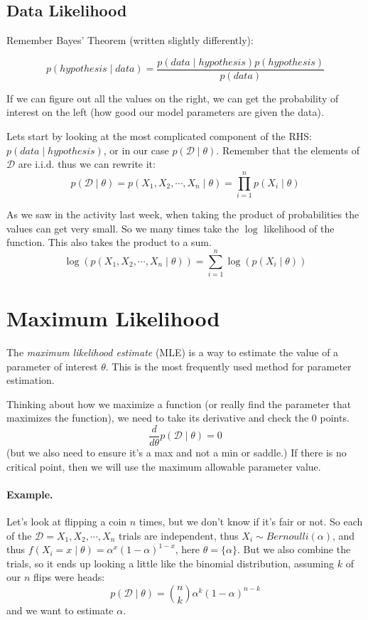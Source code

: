 \subsection{Data Likelihood}
Remember Bayes' Theorem (written slightly differently): 

\[p(hypothesis \mid data) = \frac{p(data \mid hypothesis) p(hypothesis)}{p(data)}\]

If we can figure out all the values on the right, we can get the probability of interest on the left 
(how good our model parameters are given the data).  

Lets start by looking at the most complicated component of the RHS: $p(data \mid hypothesis)$, 
or in our case $p(\mathcal{D} \mid \theta)$. 
Remember that the elements of $\mathcal{D}$ are i.i.d. thus we can rewrite it: 
\[p(\mathcal{D} \mid \theta) = p(X_1,X_2,\cdots,X_n\mid\theta) = \prod_{i=1}^n p(X_i \mid \theta)\]

\begin{aside}
As we saw in the activity last week, when taking the product of probabilities the values can get very small. 
So we many times take the $\log$ likelihood of the function. 
This also takes the product to a sum. 
\[ \log(p(X_1,X_2,\cdots,X_n\mid\theta)) = \sum_{i=1}^n \log(p(X_i \mid \theta))\]
\end{aside}

\section{Maximum Likelihood}
The \emph{maximum likelihood estimate} (MLE) is a way to estimate the value of a parameter of interest $\theta$.
This is the most frequently used method for parameter estimation. 

Thinking about how we maximize a function (or really find the parameter that maximizes the function), 
we need to take its derivative and check the $0$ points. 
\[\frac{d}{d\theta}p(\mathcal{D}\mid \theta)=0\]
(but we also need to ensure it's a max and not a min or saddle.)
If there is no critical point, then we will use the maximum allowable parameter value. 

\paragraph{Example. }
Let's look at flipping a coin $n$ times, but we don't know if it's fair or not. 
So each of the $\mathcal{D} = X_1, X_2, \cdots, X_n$ trials are independent, 
thus $X_i \sim Bernoulli(\alpha)$, and thus $f(X_i=x\mid\theta)=\alpha^x(1-\alpha)^{1-x}$, 
here $\theta = \{\alpha\}$. 
But we also combine the trials, so it ends up looking a little like the binomial distribution, 
assuming $k$ of our $n$ flips were heads: 
\[p(\mathcal{D}\mid\theta) = {n \choose k} \alpha^k(1-\alpha)^{n-k}\]
and we want to estimate $\alpha$. 

